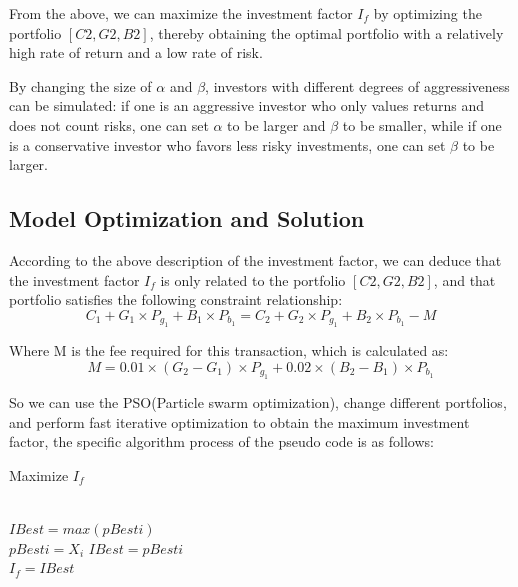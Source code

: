 \documentclass{mcmthesis}
\begin{document}
From the above, we can maximize the investment factor $I_{f}$ by optimizing the portfolio $[C2,G2,B2]$, thereby obtaining the optimal portfolio with a relatively high rate of return and a low rate of risk.

By changing the size of $\alpha$  and $\beta$, investors with different degrees of aggressiveness can be simulated: if one is an aggressive investor who only values returns and does not count risks, one can set $\alpha$  to be larger and $\beta$ to be smaller, while if one is a conservative investor who favors less risky investments, one can set $\beta$ to be larger.

\subsection{Model Optimization and Solution}

According to the above description of the investment factor, we can deduce that the investment factor $I_{f}$ is only related to the portfolio $[C2,G2,B2]$, and that portfolio satisfies the following constraint relationship:
\begin{equation}
C_{1}+G_{1} \times P_{g_{1}}+B_{1} \times P_{b_{1}}=C_{2}+G_{2} \times P_{g_{1}}+B_{2} \times P_{b_{1}} - M 
\end{equation}

Where M is the fee required for this transaction, which is calculated as:
\begin{equation}
M = 0.01\times(G_{2} - G_{1}) \times P_{g_{1}}+0.02 \times (B_{2} - B_{1}) \times P_{b_{1}}
\end{equation}

So we can use the PSO(Particle swarm optimization), change different portfolios, and perform fast iterative optimization to obtain the maximum investment factor, the specific algorithm process of the pseudo code is as follows:

\begin{algorithm} [H]
	\caption{Maximize $I_{f}$} 
	\label{alg3} 
	\begin{algorithmic}
		\ENDFOR\\
		$IBest = max(pBesti)$\\
		\STATE $pBesti = X_{i}$
		\ENDIF
		\STATE $IBest = pBesti$
		\ENDIF
		\ENDFOR
		\ENDWHILE
		\\$I_{f} = IBest$
	\end{algorithmic} 
\end{algorithm}
\end{document}

